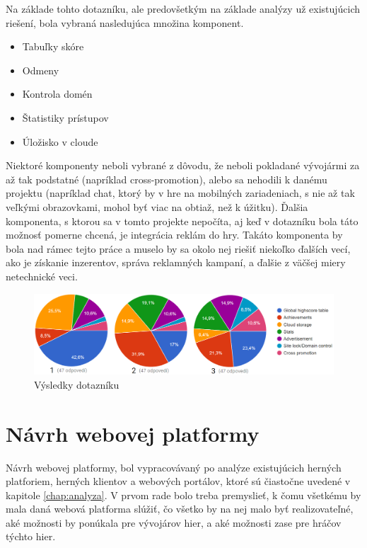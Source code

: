 Na základe tohto dotazníku, ale predovšetkým na základe analýzy už existujúcich riešení, bola vybraná nasledujúca množina komponent.
\begin{itemize}
\item Tabuľky skóre
\item Odmeny
\item Kontrola domén
\item Štatistiky prístupov
\item Úložisko v cloude
\end{itemize}
Niektoré komponenty neboli vybrané z dôvodu, že neboli pokladané vývojármi za až tak podstatné (napríklad cross-promotion), alebo sa nehodili k danému projektu (napríklad chat, ktorý by v hre na mobilných zariadeniach, s nie až tak veľkými obrazovkami, mohol byť viac na obtiaž, než k úžitku). Ďalšia komponenta, s ktorou sa v tomto projekte nepočíta, aj keď v dotazníku bola táto možnosť pomerne chcená, je integrácia reklám do hry. Takáto komponenta by bola nad rámec tejto práce a muselo by sa okolo nej riešiť niekoľko ďalších vecí, ako je získanie inzerentov, správa reklamných kampaní, a ďalšie z väčšej miery netechnické veci.
\begin{figure}[h]
  \centering
  \includegraphics[scale=0.4]{fig/graf-dotazniku.png}
  \caption{Výsledky dotazníku}
  \label{fig:dotaznik}
\end{figure}

\section{Návrh webovej platformy}
Návrh webovej platformy, bol vypracovávaný po analýze existujúcich herných platforiem, herných klientov a webových portálov, ktoré sú čiastočne uvedené v kapitole \ref{chap:analyza}. V prvom rade bolo treba premyslieť, k čomu všetkému by mala daná webová platforma slúžiť, čo všetko by na nej malo byť realizovateľné, aké možnosti by ponúkala pre vývojárov hier, a aké možnosti zase pre hráčov týchto hier.

